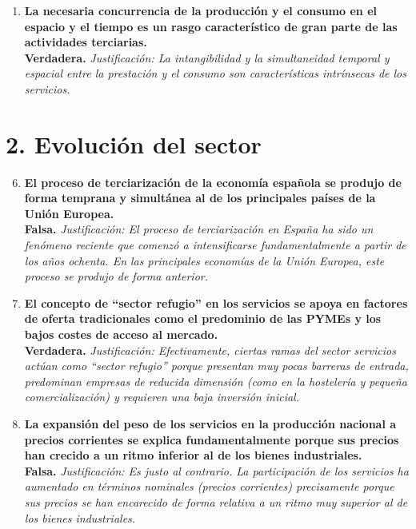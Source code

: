 \begin{enumerate}[label=\textbf{\arabic*.}]
    \item \textbf{La necesaria concurrencia de la producción y el consumo en el espacio y el tiempo es un rasgo característico de gran parte de las actividades terciarias.} \\
    \textbf{Verdadera.} \textit{Justificación: La intangibilidad y la simultaneidad temporal y espacial entre la prestación y el consumo son características intrínsecas de los servicios.}

\end{enumerate}

\section*{2. Evolución del sector}

\begin{enumerate}[label=\textbf{\arabic*.}]
    \setcounter{enumi}{5}

    \item \textbf{El proceso de terciarización de la economía española se produjo de forma temprana y simultánea al de los principales países de la Unión Europea.} \\
    \textbf{Falsa.} \textit{Justificación: El proceso de terciarización en España ha sido un fenómeno reciente que comenzó a intensificarse fundamentalmente a partir de los años ochenta. En las principales economías de la Unión Europea, este proceso se produjo de forma anterior.}

    \item \textbf{El concepto de ``sector refugio'' en los servicios se apoya en factores de oferta tradicionales como el predominio de las PYMEs y los bajos costes de acceso al mercado.} \\
    \textbf{Verdadera.} \textit{Justificación: Efectivamente, ciertas ramas del sector servicios actúan como ``sector refugio'' porque presentan muy pocas barreras de entrada, predominan empresas de reducida dimensión (como en la hostelería y pequeña comercialización) y requieren una baja inversión inicial.}

    \item \textbf{La expansión del peso de los servicios en la producción nacional a precios corrientes se explica fundamentalmente porque sus precios han crecido a un ritmo inferior al de los bienes industriales.} \\
    \textbf{Falsa.} \textit{Justificación: Es justo al contrario. La participación de los servicios ha aumentado en términos nominales (precios corrientes) precisamente porque sus precios se han encarecido de forma relativa a un ritmo muy superior al de los bienes industriales.}


\end{enumerate}
